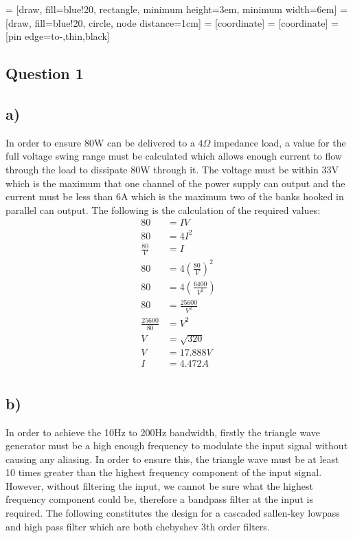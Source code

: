 \documentclass[]{article}
\title{}
\author{}
\begin{document}
 = [draw, fill=blue!20, rectangle, 
minimum height=3em, minimum width=6em]
 = [draw, fill=blue!20, circle, node distance=1cm]
 = [coordinate]
 = [coordinate]
 = [pin edge={to-,thin,black}]
\maketitle


\begin{multicols}{2}
	\section{Question 1}
	\subsection{a)}
	In order to ensure 80W can be delivered to a $4\Omega$ impedance load, a value for the full voltage swing range must be calculated which allows enough current to flow through the load to dissipate 80W through it. The voltage must be within 33V which is the maximum that one channel of the power supply can output and the current must be less than 6A which is the maximum two of the banks hooked in parallel can output.
	The following is the calculation of the required values:
	\begin{equation*}
	\begin{split}
	80&=IV\\
	80&=4I^2\\
	\frac{80}{V}&=I\\
	80&=4\left( \frac{80}{V} \right)^2\\
	80&=4\left( \frac{6400}{V^2} \right)\\
	80&=\frac{25600}{V^2}\\
	\frac{25600}{80}&=V^2\\
	V&=\sqrt{320}\\
	V&=17.888V\\
	I&=4.472A\\  
	\end{split}
	\end{equation*}
	\subsection{b)}
	In order to achieve the 10Hz to 200Hz bandwidth, firstly the triangle wave generator must be a high enough frequency to modulate the input signal without causing any aliasing. In order to ensure this, the triangle wave must be at least 10 times greater than the highest frequency component of the input signal. However, without filtering the input, we cannot be sure what the highest frequency component could be, therefore a bandpass filter at the input is required. The following constitutes the design for a cascaded sallen-key lowpass and high pass filter which are both chebyshev 3th order filters.
\end{multicols}
\end{document}
